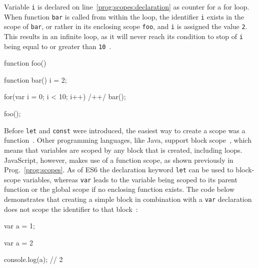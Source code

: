 \begin{program}[h]
\caption{Variable \texttt{i} is declared on line~\ref{prog:scopes:declaration} as counter for a for loop. When function \texttt{bar} is called from within the loop, the identifier \texttt{i} exists in the scope of \texttt{bar}, or rather in its enclosing scope \texttt{foo}, and \texttt{i} is assigned the value \texttt{2}. This results in an infinite loop, as it will never reach its condition to stop of \texttt{i} being equal to or greater than \texttt{10}~\cite[p.~26]{YDKJS:ScopesAndClosures:Simpson:2014}.}
\label{prog:scopes}
\begin{JsCode}
function foo() {

  function bar() {
    i = 2;
  }
  
  for(var i = 0; i < 10; i++) { /+\label{prog:scopes:declaration}+/
    bar();
  }
  
}

foo();
\end{JsCode}
\end{program}

\noindent
Before \texttt{let} and \texttt{const} were introduced, the easiest way to create a scope was a function~\cite[p.~7]{YDKJS:ES6AndBeyond:Simpson:2015}. Other programming languages, like Java, support block scope~\cite[p.~7]{YDKJS:ScopesAndClosures:Simpson:2014}, which means that variables are scoped by any block that is created, including loops. JavaScript, however, makes use of a function scope, as shown previously in Prog.~\ref{prog:scopes}. As of ES6 the declaration keyword \texttt{let} can be used to block-scope variables, whereas \texttt{var} leads to the variable being scoped to its parent function or the global scope if no enclosing function exists. The code below demonstrates that creating a simple block in combination with a \texttt{var} declaration does not scope the identifier to that block~\cite[p.~8]{YDKJS:ES6AndBeyond:Simpson:2015}:
\begin{JsCode}
var a = 1;

{
  var a = 2
}

console.log(a); // 2
\end{JsCode}

\enlargethispage{2\baselineskip}


